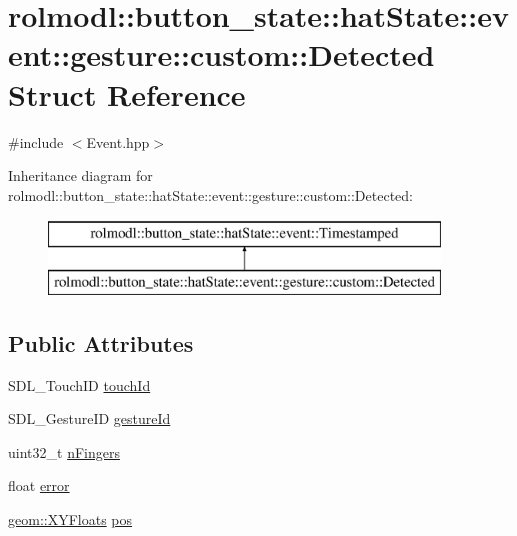 \hypertarget{structrolmodl_1_1button__state_1_1hat_state_1_1event_1_1gesture_1_1custom_1_1_detected}{}\section{rolmodl\+::button\+\_\+state\+::hat\+State\+::event\+::gesture\+::custom\+::Detected Struct Reference}
\label{structrolmodl_1_1button__state_1_1hat_state_1_1event_1_1gesture_1_1custom_1_1_detected}


{\ttfamily \#include $<$Event.\+hpp$>$}

Inheritance diagram for rolmodl\+::button\+\_\+state\+::hat\+State\+::event\+::gesture\+::custom\+::Detected\+:\begin{figure}[H]
\begin{center}
\leavevmode
\includegraphics[height=2.000000cm]{structrolmodl_1_1button__state_1_1hat_state_1_1event_1_1gesture_1_1custom_1_1_detected}
\end{center}
\end{figure}
\subsection*{Public Attributes}
\begin{DoxyCompactItemize}
\item 
S\+D\+L\+\_\+\+Touch\+ID \mbox{\hyperlink{structrolmodl_1_1button__state_1_1hat_state_1_1event_1_1gesture_1_1custom_1_1_detected_ae06f6a04143e2866826225cefdbeb080}{touch\+Id}}
\item 
S\+D\+L\+\_\+\+Gesture\+ID \mbox{\hyperlink{structrolmodl_1_1button__state_1_1hat_state_1_1event_1_1gesture_1_1custom_1_1_detected_a72efd1d21034cdbfcfee29b6779ee10f}{gesture\+Id}}
\item 
uint32\+\_\+t \mbox{\hyperlink{structrolmodl_1_1button__state_1_1hat_state_1_1event_1_1gesture_1_1custom_1_1_detected_ac633587774d06b340d7c305787809655}{n\+Fingers}}
\item 
float \mbox{\hyperlink{structrolmodl_1_1button__state_1_1hat_state_1_1event_1_1gesture_1_1custom_1_1_detected_aefc11e41ed4aa0e020c74557ff563195}{error}}
\item 
\mbox{\hyperlink{structrolmodl_1_1geom_1_1_x_y_floats}{geom\+::\+X\+Y\+Floats}} \mbox{\hyperlink{structrolmodl_1_1button__state_1_1hat_state_1_1event_1_1gesture_1_1custom_1_1_detected_a77d7045cb028124e63fdcfe67464b5a4}{pos}}
\end{DoxyCompactItemize}


